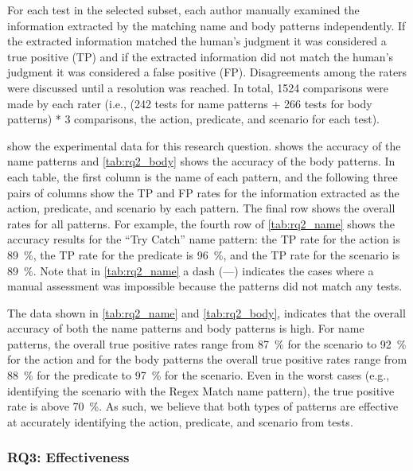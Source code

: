 For each test in the selected subset, each author manually examined the information extracted by the matching name and body patterns independently.
%
If the extracted information matched the human's judgment it was considered a true positive (TP) and if the extracted information did not match the human's judgment it was considered a false positive (FP).
%
Disagreements among the raters were discussed until a resolution was reached.
%
In total, \num{1524} comparisons were made by each rater (i.e., (\num{242} tests for name patterns + \num{266} tests for body patterns) * \num{3} comparisons, the action, predicate, and scenario for each test).


 show the experimental data for this research question.
%
 shows the accuracy of the name patterns and \cref{tab:rq2_body} shows the accuracy of the body patterns.
%
In each table, the first column is the name of each pattern, and the following three pairs of columns show the TP and FP rates for the information extracted as the action, predicate, and scenario by each pattern.
%
The final row shows the overall rates for all patterns.
%
For example, the fourth row of \cref{tab:rq2_name} shows the accuracy results for the \enquote{Try Catch} name pattern: the TP rate for the action is \SI{89}{\percent}, the TP rate for the predicate is \SI{96}{\percent}, and the TP rate for the scenario is \SI{89}{\percent}.
%
Note that in \cref{tab:rq2_name} a dash (---) indicates the cases where a manual assessment was impossible because the patterns did not match any tests.


The data shown in \cref{tab:rq2_name} and \cref{tab:rq2_body}, indicates that the overall accuracy of both the name patterns and body patterns is high.
%
For name patterns, the overall true positive rates range from \SI{87}{\percent} for the scenario to \SI{92}{\percent} for the action and for the body patterns the overall true positive rates range from \SI{88}{\percent} for the predicate to \SI{97}{\percent} for the scenario.
%
Even in the worst cases (e.g., identifying the scenario with the Regex Match name pattern), the true positive rate is above \SI{70}{\percent}.
%
As such, we believe that both types of patterns are effective at accurately identifying the action, predicate, and scenario from tests.


\subsubsection{RQ3: Effectiveness}

